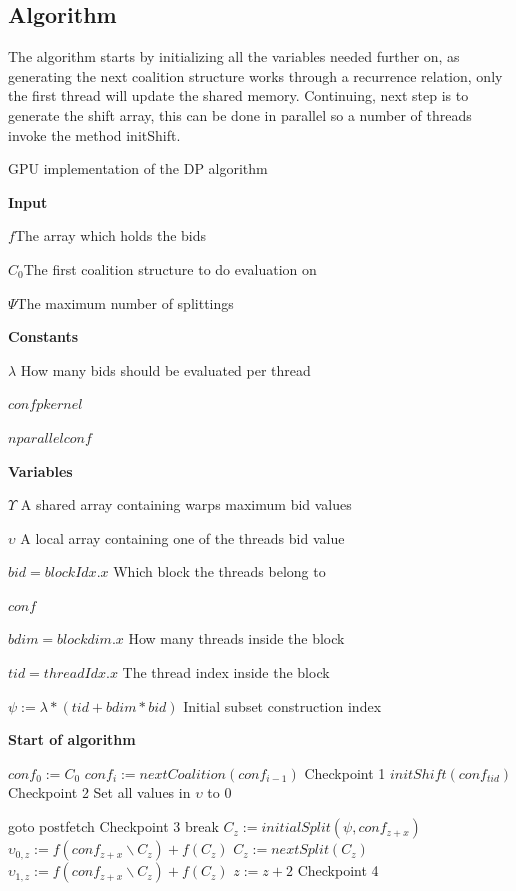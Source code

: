 \documentclass{aamas2012}
\begin{document}
\subsection{Algorithm} %
The algorithm starts by initializing all the variables needed further on,
as generating the next coalition structure works through a recurrence relation, 
only the first thread will update the shared memory. Continuing, next step is to generate the shift array, 
this can be done in parallel so a number of threads invoke the method initShift.
\begin{algorithm}
\caption{GPU implementation of the DP algorithm\label{gpudp}}
\textbf{Input}

$f$\hfill The array which holds the bids

$C_0$\hfill The first coalition structure to do evaluation on

$\Psi$\hfill The maximum number of splittings

\textbf{Constants}

$\lambda$ \hfill How many bids should be evaluated per thread

$confpkernel$

$nparallelconf$

\textbf{Variables} 

$\Upsilon$ \hfill A shared array containing warps maximum bid values

$\upsilon$ \hfill A local array containing one of the threads bid value

$bid = blockIdx.x$ \hfill Which block the threads belong to

$conf$

$bdim = blockdim.x$ \hfill How many threads inside the block

$tid = threadIdx.x$ \hfill The thread index inside the block

$\psi := \lambda*(tid+bdim*bid)$ \hfill Initial subset construction index

\textbf{Start of algorithm}
\begin{algorithmic}[1]
  \STATE $conf_0 := C_0$
    \STATE $conf_i := nextCoalition(conf_{i-1})$
  \ENDFOR \hfill Checkpoint 1
\ENDIF
{}
  \STATE $initShift(conf_{tid})$ 
\ENDIF
\hfill Checkpoint 2
  \STATE Set all values in $\upsilon$ to 0

  \IF{$\psi \geq \Psi$}
    \STATE goto postfetch
  \ENDIF
\hfill Checkpoint 3
      \STATE break
    \ENDIF
    \STATE $C_z := initialSplit(\psi,conf_{z+x})$
    \STATE $\upsilon_{0,z} := f(conf_{z+x}\backslash C_z)+f(C_z)$
    \STATE $C_z := nextSplit(C_z)$
    \STATE $\upsilon_{1,z} := f(conf_{z+x}\backslash C_z)+f(C_z)$
    \STATE $z := z + 2$
  \ENDFOR
\hfill Checkpoint 4
  \label{lst:line:reductionstart}
  

\end{algorithmic}
\end{algorithm}
\end{document}
